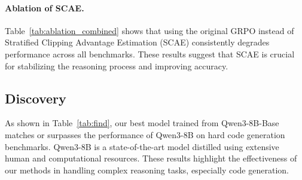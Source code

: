 % 

\paragraph{Ablation of SCAE.}

Table~\ref{tab:ablation_combined} shows that using the original GRPO instead of Stratified Clipping Advantage Estimation (SCAE) consistently degrades performance across all benchmarks.
These results suggest that SCAE is crucial for stabilizing the reasoning process and improving accuracy.


% 

\subsection{Discovery}

As shown in Table~\ref{tab:find}, our best model trained from Qwen3-8B-Base matches or surpasses the performance of Qwen3-8B on hard code generation benchmarks. 
Qwen3-8B is a state-of-the-art model distilled using extensive human and computational resources.  
These results highlight the effectiveness of our methods in handling complex reasoning tasks, especially code generation.

